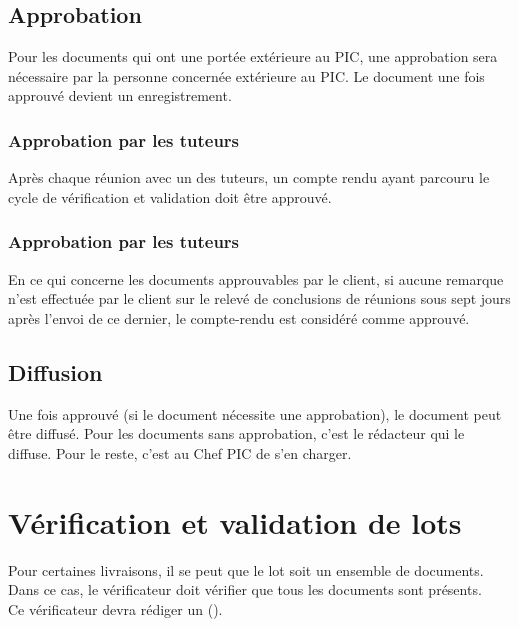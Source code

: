 \subsection{Approbation}
\label{Approbation}

Pour les documents qui ont une portée extérieure au PIC, une approbation sera nécessaire par la personne concernée extérieure au PIC. Le document une fois approuvé devient un enregistrement.

\subsubsection*{Approbation par les tuteurs}
Après chaque réunion avec un des tuteurs, un compte rendu ayant parcouru le cycle de
vérification et validation doit être approuvé.


\subsubsection*{Approbation par les tuteurs}
En ce qui concerne les documents approuvables par le client, si aucune remarque n'est effectuée
par le client sur le relevé de conclusions de réunions sous sept jours après l'envoi de ce dernier,
le compte-rendu est considéré comme approuvé.

\subsection{Diffusion}
\label{Diffusion}

Une fois approuvé (si le document nécessite une approbation), le document peut être diffusé.
Pour les documents sans approbation, c'est le rédacteur qui le diffuse. Pour le reste, c'est au
Chef PIC de s'en charger.

\section{Vérification et validation de lots}
\label{Vérification et validation de lots}

Pour certaines livraisons, il se peut que le lot soit un ensemble de documents. Dans ce cas,
le vérificateur doit vérifier que tous les documents sont présents.
\\
Ce vérificateur devra rédiger un \PVVV{} (\PVVVCourt).
